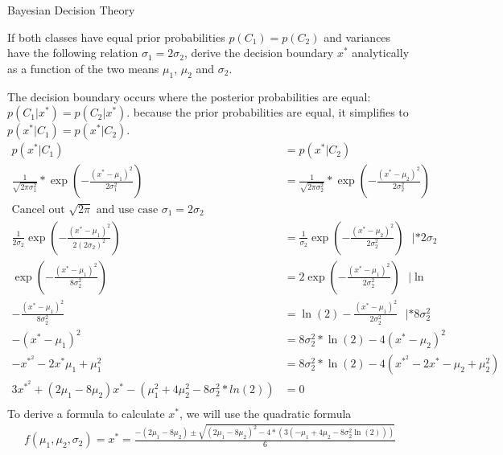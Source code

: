 \documentclass[
	english,
        solution=true
	]{tudaexercise}
\begin{document}
\begin{task}[points=4 + 8 + 8]{Bayesian Decision Theory}
\begin{subtask}[points=8,title=Decision Boundaries]
If both classes have equal prior probabilities $p(C_1) = p(C_2)$ and variances have the following relation  $\sigma_1 = 2\sigma_2$, derive the decision boundary $x^*$ analytically as a function of the two means $\mu_1$, $\mu_2$ and $\sigma_2$.

\begin{solution}
The decision boundary occurs where the posterior probabilities are equal: $p(C_1|x^*)=p(C_2|x^*)$. because the prior probabilities are equal, it simplifies to $p(x^*|C_1)=p(x^*|C_2)$. 
\begin{align*}
    p(x^*|C_1)&=p(x^*|C_2) \\ 
    \frac{1}{\sqrt{2\pi \sigma^2_1}}*\exp (-\frac{(x^*-\mu_1)^2}{2\sigma^2_1})&=\frac{1}{\sqrt{2\pi \sigma^2_2}}*\exp (-\frac{(x^*-\mu_2)^2}{2\sigma^2_2}) \\ 
    \text{Cancel out $\sqrt{2\pi}$ and use case $\sigma_1=2\sigma_2$}\\
    \frac{1}{2\sigma_2} \exp(-\frac{(x^*-\mu_1)^2}{2(2\sigma_2)^2})&=\frac{1}{\sigma_2}\exp (-\frac{(x^*-\mu_2)^2}{2 \sigma_2^2}) \,\,\,\, |*2\sigma_2 \\
    \exp (-\frac{(x^*-\mu_1)^2}{8\sigma_2^2}) &= 2 \exp (-\frac{(x^*-\mu_1)^2}{2\sigma_2^2}) \,\,\,\, | \ln \\ -\frac{(x^*-\mu_1)^2}{8\sigma_2^2} &= \ln(2) -\frac{(x^*-\mu_1)^2}{2\sigma_2^2}\,\,\,\, | * 8\sigma_2^2 \\
    -(x^*-\mu_1)^2&=8\sigma^2_2*\ln(2)-4(x^*-\mu_2)^2 \\
    -x^{*^2}-2x^*\mu_1+\mu_1^2&=8\sigma_2^2*\ln(2)-4(x^{*^2}-2x^*-\mu_2+\mu_2^2)\\
    3x^{*^2}+(2\mu_1-8\mu_2)x^*-(\mu_1^2+4\mu_2^2-8\sigma_2^2*ln(2)) &= 0\\
\end{align*}
To derive a formula to calculate $x^*$, we will use the quadratic formula
\begin{align*}
    f(\mu_1, \mu_2, \sigma_2)=x^*=\frac{-(2\mu_1-8\mu_2) \pm \sqrt{(2\mu_1-8\mu_2)^2-4*(3(-\mu_1+4\mu_2-8\sigma_2^2\ln(2)))}}{6}
\end{align*}
\end{solution}
\end{subtask}

\newpage
\begin{subtask}[points=8,title=Different Misclassification Costs]


\end{subtask}
\end{task}
\end{document}
